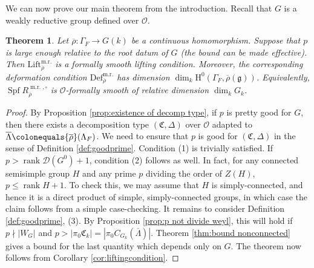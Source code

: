 \documentclass[11pt, letterpaper,english]{amsart}
\theoremstyle{plain}
\newtheorem{theorem}[lem]{Theorem}
\theoremstyle{definition}
\numberwithin{equation}{section}
\numberwithin{lem}{section}
\newcommand{\fC}{\mathfrak{C}}
\newcommand{\fg}{\mathfrak{g}}
\newcommand{\cO}{\mathcal{O}}
\newcommand{\sD}{{\mathscr D}}
\DeclareMathOperator{\rank}{rank}
\newcommand{\rhobar}{{\overline{\rho}}}
\newcommand{\gma}[1]{\Gamma_{#1}}
\DeclareMathOperator{\Spf}{Spf}
\newcommand{\cent}[2]{C_{#1}(#2)}
\newcommand{\Lbar}{\overline{\Lambda}}
\DeclareMathOperator{\mr}{m.r.}
\renewcommand{\mr}{\operatorname{m.r.}}
\begin{document}
We can now prove our main theorem from the introduction. Recall that $G$ is a weakly reductive group defined over $\cO$.

\begin{theorem} \label{thm:main theorem}
Let $\rhobar : \Gamma_F \to G(k)$ be a continuous homomorphism. Suppose that $p$ is large enough relative to the root datum of $G$ (the bound can be made effective). 
Then $\mathrm{Lift}_{\rhobar}^{\mr}$ is a formally smooth lifting condition. Moreover, the corresponding deformation condition
$\mathrm{Def}_{\rhobar}^{\mr}$ has dimension $\dim_{k} \mathrm{H}^0(\gma{F}, \rhobar(\fg))$.  Equivalently, $\Spf R^{\mr,\square}_{\rhobar}$ is $\cO$-formally smooth of relative dimension $\dim_k G_k$.
\end{theorem}

\begin{proof}
By Proposition \ref{prop:existence of decomp type}, if $p$ is pretty good for $G$, then there exists a decomposition type $(\fC,\Delta)$ over $\cO$ adapted to $\Lbar \colonequals \rhobar(\Lambda_F)$. We need to ensure that $p$ is good for $(\fC,\Delta)$ in the sense of Definition \ref{def:goodprime}.
Condition (1) is trivially satisfied.  If $p>\rank \sD(G^0) +1$, condition (2) follows as well. In fact, for any connected semisimple group $H$ and any prime $p$ dividing the order of $Z(H)$, $p \leq \rank H +1$. To check this,   
we may assume that $H$ is simply-connected, and hence it is a direct product of simple, simply-connected groups, in which case the claim follows from a simple case-checking.  
It remains to consider Definition \ref{def:goodprime}, (3). By Proposition \ref{prop:p not divide weyl}, this will hold if $p \nmid |W_G|$ and $p>|\pi_0 \fC_k|=|\pi_0 \cent{G_k}{\Lbar}|$. Theorem \ref{thm:bound nonconnected} gives a bound for the last quantity which depends only on $G$.
The theorem now follows from Corollary \ref{cor:liftingcondition}. 
\end{proof}
\end{document}
